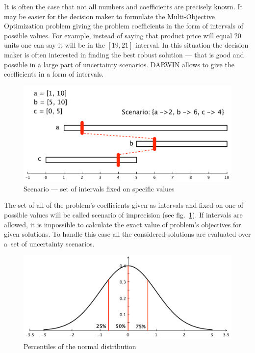 It is often the case that not all numbers and coefficients are precisely
known. It may be easier for the decision maker to formulate the
Multi-Objective Optimization problem giving the problem coefficients in the
form of intervals of possible values. For example, instead of saying that
product price will equal 20 units one can say it will be in the $[19, 21]$
interval. In this situation the decision maker is often interested in finding
the best robust solution --- that is good and possible in a large part of
uncertainty scenarios. DARWIN allows to give the coefficients in a form of
intervals.

\begin{figure}
  \centering \includegraphics[scale=0.5]{img/scenario}
  \caption{Scenario --- set of intervals fixed on specific values}
  \label{scenario}
\end{figure}

The set of all of the problem's coefficients given as intervals and fixed on
one of possible values will be called scenario of imprecision (see
fig.~\ref{scenario}). If intervals are allowed, it is impossible to calculate
the exact value of problem's objectives for given solutions. To handle this
case all the considered solutions are evaluated over a~set of uncertainty
scenarios.

\begin{figure}
  \centering \includegraphics[scale=0.6]{img/percentile}
  \caption{Percentiles of the normal distribution}
  \label{percentiles}
\end{figure}

